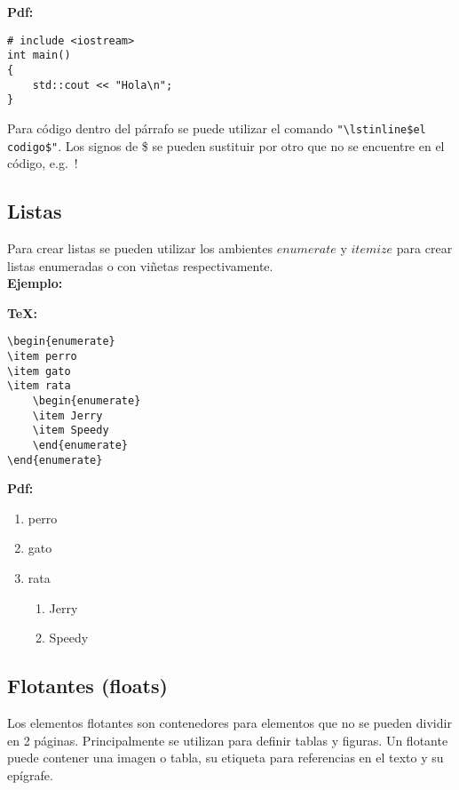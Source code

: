 \documentclass[12pt, a4paper,twoside]{article} %
\begin{document}
\textbf{Pdf:}
{
\lstset{language=C++}
\begin{lstlisting}
# include <iostream>
int main()
{
    std::cout << "Hola\n";
}
\end{lstlisting}
}

Para código dentro del párrafo se puede utilizar el comando \lstinline!"\lstinline$el codigo$"!. Los signos de \$ se pueden sustituir por otro que no se encuentre en el código, e.g.~!

\subsection{Listas}

Para crear listas se pueden utilizar los ambientes $enumerate$ y $itemize$ para crear listas enumeradas o con viñetas respectivamente.\\

\noindent\textbf{Ejemplo:}

\textbf{TeX:}

\begin{lstlisting}
\begin{enumerate}
\item perro
\item gato
\item rata
    \begin{enumerate}
    \item Jerry
    \item Speedy
    \end{enumerate}
\end{enumerate}
\end{lstlisting}

\textbf{Pdf:}

\begin{enumerate}
\item perro
\item gato
\item rata
	\begin{enumerate}
	\item Jerry
	\item Speedy
	\end{enumerate}
\end{enumerate}

\subsection{Flotantes (floats)}

Los elementos flotantes son contenedores para elementos que no se pueden dividir en 2 páginas. Principalmente se utilizan para definir tablas y figuras. Un flotante puede contener una imagen o tabla, su etiqueta para referencias en el texto y su epígrafe.
\end{document}
